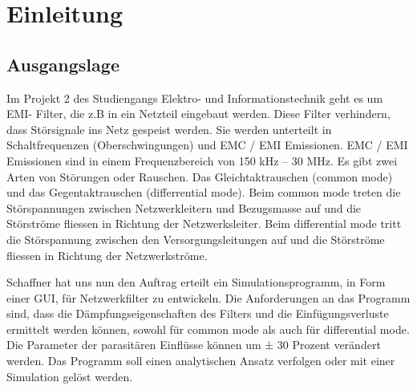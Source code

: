 \section{Einleitung}
\subsection{Ausgangslage}
Im Projekt 2 des Studiengangs Elektro- und Informationstechnik geht es um EMI- Filter, die z.B in ein Netzteil eingebaut werden. Diese Filter verhindern, dass Störsignale ins Netz gespeist werden. Sie werden unterteilt in Schaltfrequenzen (Oberschwingungen) und EMC / EMI Emissionen. EMC / EMI Emissionen sind in einem Frequenzbereich von 150 kHz – 30 MHz. Es gibt zwei Arten von Störungen oder Rauschen. Das Gleichtaktrauschen  (common mode) und das Gegentaktrauschen (differrential mode). Beim common mode treten die Störspannungen zwischen Netzwerkleitern und Bezugsmasse auf und die Störströme fliessen in Richtung der Netzwerksleiter. Beim differential mode tritt die Störspannung zwischen den Versorgungsleitungen auf und die Störströme fliessen in Richtung der Netzwerkströme. 

Schaffner hat uns nun den Auftrag erteilt ein Simulationsprogramm, in Form einer GUI, für Netzwerkfilter zu entwickeln. Die Anforderungen an das Programm sind, dass die Dämpfungseigenschaften des Filters und die Einfügungsverluste ermittelt werden können, sowohl für common mode als auch für differential mode. Die Parameter der parasitären Einflüsse können um ± 30 Prozent verändert werden. Das Programm soll einen analytischen Ansatz verfolgen oder mit einer Simulation gelöst werden.



